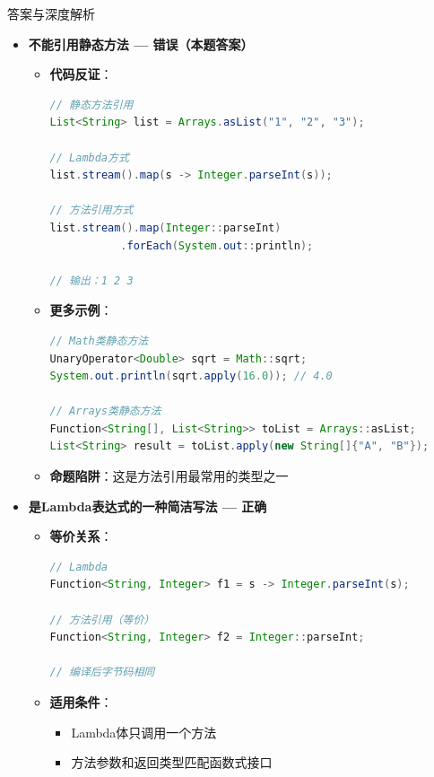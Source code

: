 \documentclass[12pt, a4paper]{ctexart}
\begin{document}
\begin{enumerate}[label=\textbf{\arabic*.}]
\begin{bluebox}{答案与深度解析}
\begin{itemize}[leftmargin=*, nosep, label={}]
			      \item[C] \textbf{不能引用静态方法 — 错误（本题答案）}
			            \begin{itemize}[label={}, leftmargin=*, nosep]
				            \item \textbf{代码反证}：
				                  \begin{lstlisting}[language=Java]
// 静态方法引用
List<String> list = Arrays.asList("1", "2", "3");

// Lambda方式
list.stream().map(s -> Integer.parseInt(s));

// 方法引用方式
list.stream().map(Integer::parseInt)
           .forEach(System.out::println);

// 输出：1 2 3
				      \end{lstlisting}
				            \item \textbf{更多示例}：
				                  \begin{lstlisting}[language=Java]
// Math类静态方法
UnaryOperator<Double> sqrt = Math::sqrt;
System.out.println(sqrt.apply(16.0)); // 4.0

// Arrays类静态方法
Function<String[], List<String>> toList = Arrays::asList;
List<String> result = toList.apply(new String[]{"A", "B"});
				      \end{lstlisting}
				            \item \textbf{命题陷阱}：这是方法引用最常用的类型之一
			            \end{itemize}

			      \item[D] \textbf{是Lambda表达式的一种简洁写法 — 正确}
			            \begin{itemize}[label={}, leftmargin=*, nosep]
				            \item \textbf{等价关系}：
				                  \begin{lstlisting}[language=Java]
// Lambda
Function<String, Integer> f1 = s -> Integer.parseInt(s);

// 方法引用（等价）
Function<String, Integer> f2 = Integer::parseInt;

// 编译后字节码相同
				      \end{lstlisting}
				            \item \textbf{适用条件}：
				                  \begin{itemize}[label={}, nosep]
					                  \item Lambda体只调用一个方法
					                  \item 方法参数和返回类型匹配函数式接口
				                  \end{itemize}
			            \end{itemize}
		      \end{itemize}


\end{bluebox}
\end{enumerate}
\end{document}
